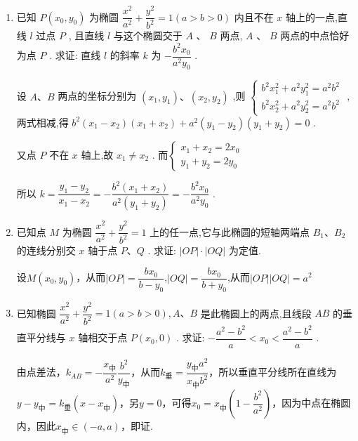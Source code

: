 \begin{enumerate}
 \item 已知 $P\left( {{x}_{0},{y}_{0}}\right)$ 为椭圆 $\dfrac{{x}^{2}}{{a}^{2}} + \dfrac{{y}^{2}}{{b}^{2}} = 1\left( {a > b > 0}\right)$ 内且不在 $x$ 轴上的一点,直线 $l$ 过点 $P$ , 且直线 $l$ 与这个椭圆交于 $A$ 、 $B$ 两点, $A$ 、 $B$ 两点的中点恰好为点 $P$ . 求证: 直线 $l$ 的斜率 $k$ 为 $- \dfrac{{b}^{2}{x}_{0}}{{a}^{2}{y}_{0}}$ .
\begin{jieda}
    设 $ A\text{、}B $ 两点的坐标分别为 $ \left( {{x}_{1},{y}_{1}}\right) \text{、}\left( {{x}_{2},{y}_{2}}\right) $ ,则 $\left\{\begin{array}{l}
         {b}^{2}{x}_{1}^{2} + {a}^{2}{y}_{1}^{2} = {a}^{2}{b}^{2}  \\
         {b}^{2}{x}_{2}^{2} + {a}^{2}{y}_{2}^{2} = {a}^{2}{b}^{2} 
    \end{array} \right.$ , 两式相减,得 $ {b}^{2}\left( {{x}_{1} - {x}_{2}}\right) \left( {{x}_{1} + {x}_{2}}\right)  + {a}^{2}\left( {{y}_{1} - {y}_{2}}\right) \left( {{y}_{1} + {y}_{2}}\right)  = 0 $ . 
    
    又点 $ P $ 不在 $ x $ 轴上,故 $ {x}_{1} \neq  {x}_{2} $ . 而$\left\{\begin{array}{l}
         {x}_{1} + {x}_{2} = 2{x}_{0}  \\
         {y}_{1} + {y}_{2} = 2{y}_{0}
    \end{array} \right.$
    
    所以 $ k = \dfrac{{y}_{1} - {y}_{2}}{{x}_{1} - {x}_{2}} =  - \dfrac{{b}^{2}\left( {{x}_{1} + {x}_{2}}\right) }{{a}^{2}\left( {{y}_{1} + {y}_{2}}\right) } =  - \dfrac{{b}^{2}{x}_{0}}{{a}^{2}{y}_{0}} $ .
\end{jieda}

 \item 已知点 $M$ 为椭圆 $\dfrac{{x}^{2}}{{a}^{2}} + \dfrac{{y}^{2}}{{b}^{2}} = 1$ 上的任一点,它与此椭圆的短轴两端点 ${B}_{1}\text{、}{B}_{2}$ 的连线分别交 $x$ 轴于点 $P\text{、}Q$ . 求证: $\left| {OP}\right|  \cdot  \left| {OQ}\right|$ 为定值.
\begin{jieda}
    设$M(x_0,y_0)$，从而$|OP|=\dfrac{bx_0}{b-y_0}$,$|OQ|=\dfrac{bx_0}{b+y_0}$,从而$|OP||OQ|=a^2$
\end{jieda}


 \item 已知椭圆 $\dfrac{{x}^{2}}{{a}^{2}} + \dfrac{{y}^{2}}{{b}^{2}} = 1\left( {a > b > 0}\right) ,A\text{、}B$ 是此椭圆上的两点,且线段 ${AB}$ 的垂直平分线与 $x$ 轴相交于点 $P\left( {{x}_{0},0}\right)$ . 求证: $- \dfrac{{a}^{2} - {b}^{2}}{a} < {x}_{0} < \dfrac{{a}^{2} - {b}^{2}}{a}$ .
\begin{jieda}
    由点差法，$k_{AB}=-\dfrac{x_中}{a^2}\dfrac{b^2}{y_中}$，从而$k_垂=\dfrac{y_中a^2}{x_中b^2}$，所以垂直平分线所在直线为$y-y_中=k_垂(x-x_中)$，另$y=0$，可得$x_0=x_中(1-\dfrac{b^2}{a^2})$，因为中点在椭圆内，因此$x_中\in(-a,a)$，即证.
\end{jieda}



\end{enumerate}
